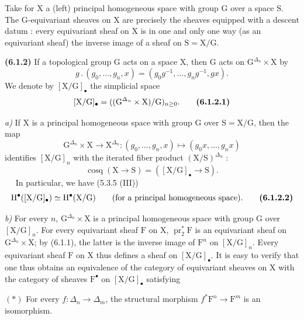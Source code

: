 \documentclass[11pt,leqno]{article}
\newcommand{\Page}[1]{\ifvmode\noindent\else\unskip\ \fi{\footnotesize\textcolor{gray}{[p.\,#1]}}\ \ignorespaces}
\begin{document}
Take for \(\mathrm{X}\) a (left) principal homogeneous space with group \(\mathrm{G}\) over a space \(\mathrm{S}\). The \(\mathrm{G}\)-equivariant sheaves on \(\mathrm{X}\) are precisely the sheaves equipped with a descent datum : every equivariant sheaf on \(\mathrm{X}\) is in one and only one way (as an equivariant sheaf) the inverse image of a sheaf on \(\mathrm{S}=\mathrm{X}/\mathrm{G}\).

\textbf{(6.1.2)} If a topological group \(\mathrm{G}\) acts on a space \(\mathrm{X}\), then \(\mathrm{G}\) acts on \(\mathrm{G}^{\Delta_n}\times\mathrm{X}\) by
\[
g\mathbin{.}(g_0,\ldots,g_n,x)
=(g_0g^{-1},\ldots,g_ng^{-1},gx).
\]
We denote by \([\mathrm{X}/\mathrm{G}]_{\bullet}\) the simplicial space
\[
[\mathrm{X}/\mathrm{G}]_{\bullet}
=((\mathrm{G}^{\Delta_n}\times\mathrm{X})/\mathrm{G})_{n\geq 0}.
\tag*{\textbf{(6.1.2.1)}}
\]

\textit{a)} If \(\mathrm{X}\) is a principal homogeneous space with group \(\mathrm{G}\) over \(\mathrm{S}=\mathrm{X}/\mathrm{G}\), then the map
\[
\mathrm{G}^{\Delta_n}\times\mathrm{X}\to\mathrm{X}^{\Delta_n}:
(g_0,\ldots,g_n,x)\mapsto(g_0x,\ldots,g_nx)
\]
identifies \([\mathrm{X}/\mathrm{G}]_n\) with the iterated fiber product \((\mathrm{X}/\mathrm{S})^{\Delta_n}\) :
\[
\operatorname{cosq}(\mathrm{X}\to\mathrm{S})
=([\mathrm{X}/\mathrm{G}]_{\bullet}\to\mathrm{S}).
\]
\Page{17}
In particular, we have (5.3.5 (III))
\[
\mathrm{H}^{\bullet}([\mathrm{X}/\mathrm{G}]_{\bullet})
\simeq\mathrm{H}^{\bullet}(\mathrm{X}/\mathrm{G})
\qquad\text{(for a principal homogeneous space).}
\tag*{\textbf{(6.1.2.2)}}
\]

\textit{b)} For every \(n\), \(\mathrm{G}^{\Delta_n}\times\mathrm{X}\) is a principal homogeneous space with group \(\mathrm{G}\) over \([\mathrm{X}/\mathrm{G}]_n\). For every equivariant sheaf \(\mathrm{F}\) on \(\mathrm{X}\), \(\operatorname{pr}_2^*\mathrm{F}\) is an equivariant sheaf on \(\mathrm{G}^{\Delta_n}\times\mathrm{X}\); by (6.1.1), the latter is the inverse image of \(\mathrm{F}^n\) on \([\mathrm{X}/\mathrm{G}]_n\). Every equivariant sheaf \(\mathrm{F}\) on \(\mathrm{X}\) thus defines a sheaf on \([\mathrm{X}/\mathrm{G}]_{\bullet}\). It is easy to verify that one thus obtains an equivalence of the category of equivariant sheaves on \(\mathrm{X}\) with the category of sheaves \(\mathrm{F}^{\bullet}\) on \([\mathrm{X}/\mathrm{G}]_{\bullet}\) satisfying

\((\ast)\) For every \(f:\Delta_n\to\Delta_m\), the structural morphism \(f^*\mathrm{F}^n\to\mathrm{F}^m\) is an isomorphism.
\end{document}
